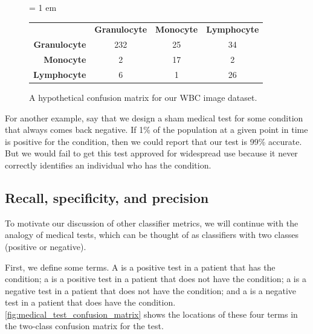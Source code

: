 \begin{figure}[h]
\centering
\tabcolsep = 1 em
\mySfFamily
{}
\begin{tabular}{r c c c}
\rowcolor{gray!50}
& \textbf{Granulocyte} & \textbf{Monocyte} & \textbf{Lymphocyte} \\
 \textbf{Granulocyte} & 232 & 25 & 34 \\
\textbf{Monocyte} & \phantom{55}2 & 17 & \phantom{5}2 \\
\textbf{Lymphocyte} & \phantom{55}6 & \phantom{5}1 & 26
\end{tabular}
\caption{A hypothetical confusion matrix for our WBC image dataset.}
\label{fig:wbc_better_confusion_matrix}
\end{figure}

For another example, say that we design a sham medical test for some condition that always comes back negative. If 1\% of the population at a given point in time is positive for the condition, then we could report that our test is 99\% accurate. But we would fail to get this test approved for widespread use because it never correctly identifies an individual who has the condition.\\

\begin{qbox}\end{qbox}

\FloatBarrier
{}
\subsection{Recall, specificity, and precision}

To motivate our discussion of other classifier metrics, we will continue with the analogy of medical tests, which can be thought of as classifiers with two classes (positive or negative).

First, we define some terms. A  is a positive test in a patient that has the condition; a  is a positive test in a patient that does not have the condition; a  is a negative test in a patient that does not have the condition; and a  is a negative test in a patient that does have the condition. \autoref{fig:medical_test_confusion_matrix} shows the locations of these four terms in the two-class confusion matrix for the test.\\

